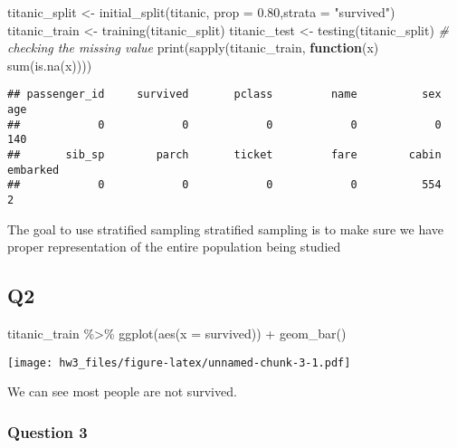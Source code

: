 \documentclass[
]{article}
\newenvironment{Shaded}{\begin{snugshade}}{\end{snugshade}}
\newcommand{\AttributeTok}[1]{\textcolor[rgb]{0.77,0.63,0.00}{#1}}
\newcommand{\CommentTok}[1]{\textcolor[rgb]{0.56,0.35,0.01}{\textit{#1}}}
\newcommand{\ControlFlowTok}[1]{\textcolor[rgb]{0.13,0.29,0.53}{\textbf{#1}}}
\newcommand{\FloatTok}[1]{\textcolor[rgb]{0.00,0.00,0.81}{#1}}
\newcommand{\FunctionTok}[1]{\textcolor[rgb]{0.00,0.00,0.00}{#1}}
\newcommand{\NormalTok}[1]{#1}
\newcommand{\OtherTok}[1]{\textcolor[rgb]{0.56,0.35,0.01}{#1}}
\newcommand{\SpecialCharTok}[1]{\textcolor[rgb]{0.00,0.00,0.00}{#1}}
\newcommand{\StringTok}[1]{\textcolor[rgb]{0.31,0.60,0.02}{#1}}
\begin{document}
\begin{Shaded}
\begin{Highlighting}[]
\NormalTok{titanic\_split }\OtherTok{\textless{}{-}} \FunctionTok{initial\_split}\NormalTok{(titanic, }\AttributeTok{prop =} \FloatTok{0.80}\NormalTok{,}\AttributeTok{strata =} \StringTok{"survived"}\NormalTok{)}
\NormalTok{titanic\_train }\OtherTok{\textless{}{-}} \FunctionTok{training}\NormalTok{(titanic\_split)}
\NormalTok{titanic\_test }\OtherTok{\textless{}{-}} \FunctionTok{testing}\NormalTok{(titanic\_split)}
\CommentTok{\# checking the missing value}
\FunctionTok{print}\NormalTok{(}\FunctionTok{sapply}\NormalTok{(titanic\_train, }\ControlFlowTok{function}\NormalTok{(x) }\FunctionTok{sum}\NormalTok{(}\FunctionTok{is.na}\NormalTok{(x))))}
\end{Highlighting}
\end{Shaded}

\begin{verbatim}
## passenger_id     survived       pclass         name          sex          age 
##            0            0            0            0            0          140 
##       sib_sp        parch       ticket         fare        cabin     embarked 
##            0            0            0            0          554            2
\end{verbatim}

The goal to use stratified sampling stratified sampling is to make sure
we have proper representation of the entire population being studied

\hypertarget{q2}{%
\subsection{Q2}\label{q2}}

\begin{Shaded}
\begin{Highlighting}[]
\NormalTok{titanic\_train }\SpecialCharTok{\%\textgreater{}\%} 
 \FunctionTok{ggplot}\NormalTok{(}\FunctionTok{aes}\NormalTok{(}\AttributeTok{x =}\NormalTok{ survived)) }\SpecialCharTok{+}
 \FunctionTok{geom\_bar}\NormalTok{()}
\end{Highlighting}
\end{Shaded}

\texttt{[image: hw3\_files/figure-latex/unnamed-chunk-3-1.pdf]}

We can see most people are not survived.

\hypertarget{question-3}{%
\subsubsection{Question 3}\label{question-3}}
\end{document}
